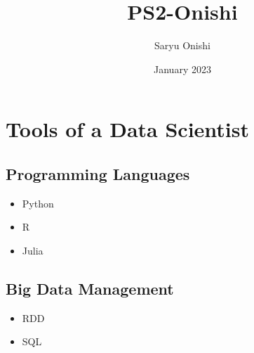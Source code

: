 \documentclass{article}
\title{PS2-Onishi}
\author{Saryu Onishi}
\date{January 2023}
\begin{document}
\maketitle

\section{Tools of a Data Scientist}
\subsection{Programming Languages}
\begin{itemize}
  \item Python
  \item R
  \item Julia
\end{itemize}
\subsection{Big Data Management}
\begin{itemize}
 \item RDD
 \item SQL
\end{itemize}
\end{document}
